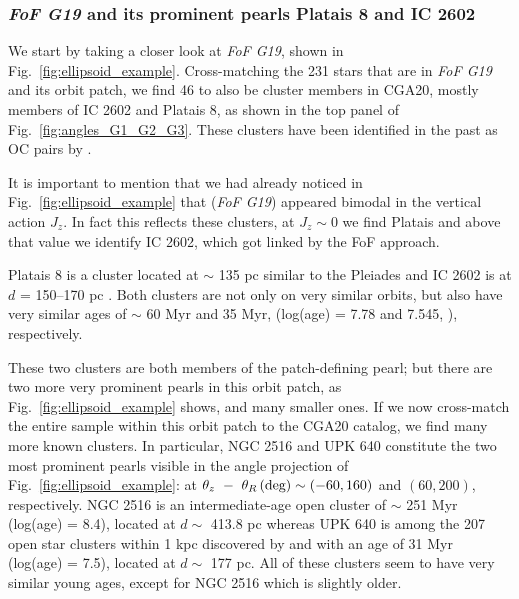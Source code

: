 \documentclass[twocolumn]{aastex631}
\begin{document}
\subsubsection{\textit{FoF G19} and its prominent pearls Platais 8 and IC 2602}
\label{case_study1}

We start by taking a closer look at \textit{FoF G19}, shown in Fig.~\ref{fig:ellipsoid_example}.
Cross-matching the 231 stars that  are in \textit{FoF G19} and its orbit patch,
we find 46 to also be cluster members in CGA20, mostly members of 
IC 2602 and Platais 8, as shown in the top panel of Fig.~\ref{fig:angles_G1_G2_G3}. These clusters have been identified in the past as OC pairs by \citet{2017A&A...600A.106C}.

It is important to mention that we had already noticed in Fig.~\ref{fig:ellipsoid_example} that (\textit{FoF G19}) appeared bimodal in the vertical action $J_{z}$. In fact this reflects
these clusters, at $J_{z}\sim 0$ we find Platais and above that value we identify IC 2602, which got linked by the FoF approach.

Platais 8 is a cluster located at $\sim$ 135 pc similar to the Pleiades \citep{2018A&A...619A.155S} and IC 2602 is at $d$ = 150--170 pc \citep{2005A&A...438.1163K}. Both clusters are not only on very similar orbits, but also have very similar ages of $\sim$ 60 Myr and 35 Myr, (log(age) = 7.78 and 7.545, \citet{2002A&A...389..871D,2021A&A...645A..84M}), respectively. 

These two clusters are both members of the patch-defining pearl; but there are two more very prominent pearls in this orbit patch, as Fig.~\ref{fig:ellipsoid_example} shows, and many smaller ones. If we now cross-match the entire sample within this orbit patch to the CGA20 catalog, we find many more known clusters. In particular, NGC 2516 and UPK 640 constitute the two most prominent pearls visible in the angle projection of Fig.~\ref{fig:ellipsoid_example}: at $\theta_{z}~-~\theta_{R}\,\rm(deg) \sim (-60, 160)$ and $(60, 200)$, respectively. NGC 2516 is an intermediate-age open cluster of $\sim$ 251 Myr (log(age) = 8.4), located at $d \sim$ 413.8 pc \citep{2021A&A...645A..84M} whereas UPK 640 is among the 207 open star clusters within 1 kpc discovered by \citet{2019JKAS...52..145S} and with an age of 31 Myr (log(age) = 7.5), located at $d \sim$ 177 pc. All of these clusters seem to have very similar young ages, except for NGC 2516 which is slightly older. 
\end{document}
